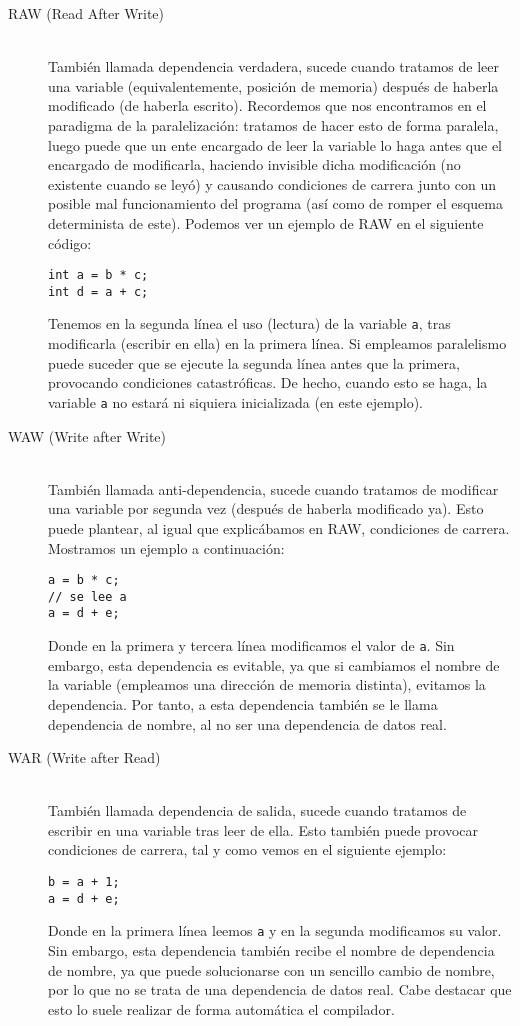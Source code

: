 \begin{description}
    \item [RAW (Read After Write)]~\\
        También llamada dependencia verdadera, sucede cuando tratamos de leer una variable (equivalentemente, posición de memoria) después de haberla modificado (de haberla escrito). Recordemos que nos encontramos en el paradigma de la paralelización: tratamos de hacer esto de forma paralela, luego puede que un ente encargado de leer la variable lo haga antes que el encargado de modificarla, haciendo invisible dicha modificación (no existente cuando se leyó) y causando condiciones de carrera junto con un posible mal funcionamiento del programa (así como de romper el esquema determinista de este). Podemos ver un ejemplo de RAW en el siguiente código:
    \begin{verbatim}
int a = b * c;
int d = a + c;
    \end{verbatim}
Tenemos en la segunda línea el uso (lectura) de la variable \verb|a|, tras modificarla (escribir en ella) en la primera línea. Si empleamos paralelismo puede suceder que se ejecute la segunda línea antes que la primera, provocando condiciones catastróficas. De hecho, cuando esto se haga, la variable \verb|a| no estará ni siquiera inicializada (en este ejemplo).

    \item [WAW (Write after Write)]~\\
        También llamada anti-dependencia, sucede cuando tratamos de modificar una variable por segunda vez (después de haberla modificado ya). Esto puede plantear, al igual que explicábamos en RAW, condiciones de carrera. Mostramos un ejemplo a continuación:
    \begin{verbatim}
a = b * c;
// se lee a
a = d + e;
    \end{verbatim}
Donde en la primera y tercera línea modificamos el valor de \verb|a|. Sin embargo, esta dependencia es evitable, ya que si cambiamos el nombre de la variable (empleamos una dirección de memoria distinta), evitamos la dependencia. Por tanto, a esta dependencia también se le llama dependencia de nombre, al no ser una dependencia de datos real.

    \item [WAR (Write after Read)]~\\
        También llamada dependencia de salida, sucede cuando tratamos de escribir en una variable tras leer de ella. Esto también puede provocar condiciones de carrera, tal y como vemos en el siguiente ejemplo:
    \begin{verbatim}
b = a + 1;
a = d + e;
    \end{verbatim}
Donde en la primera línea leemos \verb|a| y en la segunda modificamos su valor. Sin embargo, esta dependencia también recibe el nombre de dependencia de nombre, ya que puede solucionarse con un sencillo cambio de nombre, por lo que no se trata de una dependencia de datos real. Cabe destacar que esto lo suele realizar de forma automática el compilador.
\end{description}

